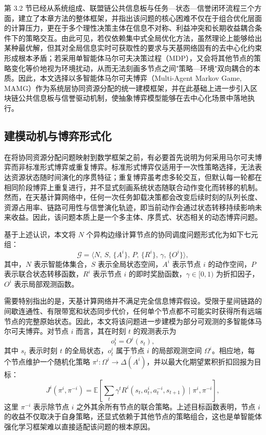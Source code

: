 第 3.2 节已经从系统组成、联盟链公共信息板与任务—状态—信誉闭环流程三个方面，建立了本章方法的整体框架，并指出该问题的核心困难不仅在于组合优化层面的计算压力，更在于多个理性决策主体在信息不对称、利益冲突和长期收益耦合条件下的策略交互。由此可见，若仅依赖集中式全局优化方法，虽然理论上能够给出某种最优解，但其对全局信息实时可获取性的要求与天基网络固有的去中心化约束形成根本矛盾；若采用单智能体马尔可夫决策过程（MDP），又会将其他节点的策略变化等价地视为环境扰动，从而无法刻画多节点之间"策略—环境"双向耦合的本质。因此，本文选择以多智能体马尔可夫博弈（Multi-Agent Markov Game, MAMG）作为系统层协同资源分配的统一建模框架，并在此基础上进一步引入区块链公共信息板与信誉驱动机制，使抽象博弈模型能够在去中心化场景中落地执行。

\subsection{建模动机与博弈形式化}

在将协同资源分配问题映射到数学框架之前，有必要首先说明为何采用马尔可夫博弈而非标准形式博弈或重复博弈。标准形式博弈仅适用于一次性策略选择，无法表达资源状态随时间演化的序贯特征；重复博弈虽考虑多轮交互，但默认每一轮都在相同阶段博弈上重复进行，并不显式刻画系统状态随联合动作变化而转移的机制。然而，在天基计算网络中，任何一次任务卸载决策都会改变后续时刻的队列长度、资源占用率、链路可用性与信誉演化轨迹，即当前动作会通过状态转移持续影响未来收益。因此，该问题本质上是一个多主体、序贯式、状态相关的动态博弈问题。

基于上述认识，本文将 $N$ 个异构边缘计算节点的协同调度问题形式化为如下七元组：
\begin{equation}
  \mathcal{G}=\langle N,\,S,\,\{A^i\},\,P,\,\{R^i\},\,\gamma,\,\{O^i\}\rangle,
  \label{eq:margov_game}
\end{equation}
其中，$N$ 表示智能体集合，$S$ 表示全局状态空间，$A^i$ 表示节点 $i$ 的动作空间，$P$ 表示联合状态转移函数，$R^i$ 表示节点 $i$ 的即时奖励函数，$\gamma\in[0,1)$ 为折扣因子，$O^i$ 表示局部观测函数。

需要特别指出的是，天基计算网络并不满足完全信息博弈假设。受限于星间链路的间歇连通性、有限带宽和状态同步代价，任何单个节点都不可能实时获得所有远端节点的完整原始状态。因此，本文将该问题进一步建模为部分可观测的多智能体马尔可夫博弈。对节点 $i$ 而言，其在时刻 $t$ 的观测表示为
\begin{equation}
  o_t^i = O^i(s_t),
  \label{eq:obs_func}
\end{equation}
其中 $s_t$ 表示时刻 $t$ 的全局状态，$o_t^i$ 属于节点 $i$ 的局部观测空间 $\Omega^i$。相应地，每个节点维护一个随机化策略 $\pi^i:\Omega^i\to \Delta(A^i)$，并以最大化期望累积折扣回报为目标：
\begin{equation}
  J^i(\pi^i,\pi^{-i})=\mathbb{E}\!\left[\sum_t\gamma^t R^i\!\left(s_t,a_t^i,a_t^{-i},s_{t+1}\right)\mid \pi^i,\pi^{-i}\right],
  \label{eq:return}
\end{equation}
这里 $\pi^{-i}$ 表示除节点 $i$ 之外其余所有节点的联合策略。上述目标函数表明，节点 $i$ 的收益不仅取决于自身策略，还显式依赖于其他节点的策略组合，这也是单智能体强化学习框架难以直接适配该问题的根本原因。


